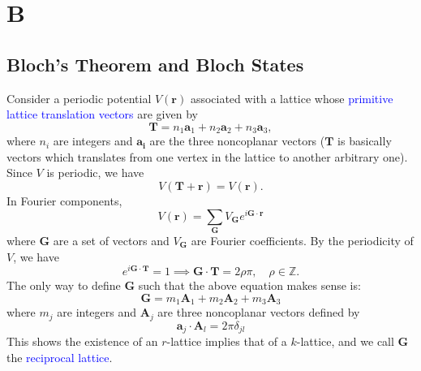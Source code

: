 \documentclass{book}
\theoremstyle{definition}
\begin{document}
\chapter*{B}


\section*{Bloch's Theorem and Bloch States}


Consider a periodic potential $V(\mathbf{r})$ associated with a lattice whose \textcolor{blue}{primitive lattice translation vectors} are given by 
\begin{equation*}
\mathbf{T} = n_1 \mathbf{a}_1 +  n_2 \mathbf{a}_2  +  n_3 \mathbf{a}_3,
\end{equation*}
where $n_i$ are integers and $\mathbf{a_i}$ are the three noncoplanar vectors ($\mathbf{T}$ is basically vectors which translates from one vertex in the lattice to another arbitrary one). Since $V$ is periodic, we have
\begin{equation*}
V(\mathbf{T} + \mathbf{r}) = V(\mathbf{r}). 
\end{equation*}
In Fourier components, 
\begin{equation*}
V(\mathbf{r}) = \sum_\mathbf{G} V_\mathbf{G} e^{i\mathbf{G}\cdot \mathbf{r}}
\end{equation*}
where $\mathbf{G}$ are a set of vectors and $V_\mathbf{G}$ are Fourier coefficients. By the periodicity of $V$, we have
\begin{equation*}
e^{i\mathbf{G}\cdot \mathbf{T}} = 1 \implies \mathbf{G}\cdot \mathbf{T} = 2\rho \pi, \quad \rho \in \mathbb{Z}.
\end{equation*}
The only way to define $\mathbf{G}$ such that the above equation makes sense is:
\begin{equation*}
\mathbf{G} = m_1 \mathbf{A}_1 + m_2 \mathbf{A}_2 + m_3 \mathbf{A}_3
\end{equation*}
where $m_j$ are integers and $\mathbf{A}_j$ are three noncoplanar vectors defined by 
\begin{equation*}
\mathbf{a}_j \cdot \mathbf{A}_l = 2\pi \delta_{jl}
\end{equation*}
This shows the existence of an $r$-lattice implies that of a $k$-lattice, and we call $\mathbf{G}$ the \textcolor{blue}{reciprocal lattice}. \\
\end{document}
